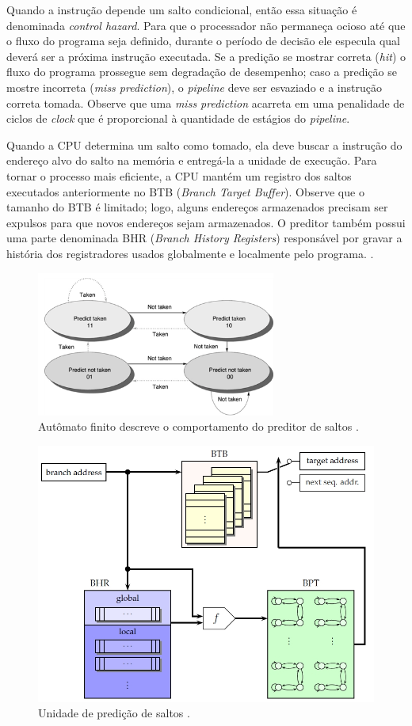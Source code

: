 Quando a instru\c{c}\~{a}o depende um salto condicional, ent\~{a}o essa situa\c{c}\~{a}o \'{e} denominada \textit{control hazard}. Para que o processador n\~{a}o permane\c{c}a ocioso at\'{e} que o fluxo do programa seja definido, durante o per\'{i}odo de decis\~{a}o ele especula qual dever\'{a} ser a pr\'{o}xima instru\c{c}\~{a}o executada. Se a predi\c{c}\~{a}o se mostrar correta (\textit{hit}) o fluxo do programa prossegue sem degrada\c{c}\~{a}o de desempenho; caso a predi\c{c}\~{a}o se mostre incorreta (\textit{miss prediction}), o \textit{pipeline} deve ser esvaziado e a instru\c{c}\~{a}o correta tomada. Observe que uma \textit{miss prediction} acarreta em uma penalidade de ciclos de \textit{clock} que \'{e} proporcional \`{a} quantidade de est\'{a}gios do \textit{pipeline}.

Quando a CPU determina um salto como tomado, ela deve buscar a instru\c{c}\~{a}o do endere\c{c}o alvo do salto na mem\'{o}ria e entreg\'{a}-la a unidade de execu\c{c}\~{a}o. Para tornar o processo mais eficiente, a CPU mant\'{e}m um registro dos saltos executados anteriormente no BTB (\textit{Branch Target Buffer}). Observe que o tamanho do BTB \'{e} limitado; logo, alguns endere\c{c}os armazenados precisam ser expulsos para que novos endere\c{c}os sejam armazenados.
O preditor tamb\'{e}m possui uma parte denominada BHR (\textit{Branch History Registers}) respons\'{a}vel por gravar a hist\'{o}ria dos registradores usados globalmente e localmente pelo programa. \cite{Jean-Pierre06predictingsecret}.

\begin{figure}[ht]
	\centering
	\includegraphics[width=0.7\textwidth]{figures/automato.png}
	\caption{Aut\^{o}mato finito descreve o comportamento do preditor de saltos \cite{493986}.}
	\label{fig:Fig_automato}
\end{figure}

\begin{figure}[ht]
	\centering
	\includegraphics[width=.5\textwidth]{figures/btu.jpg}
	\caption{Unidade de predi\c{c}\~{a}o de saltos \cite{Jean-Pierre06predictingsecret}.}
	\label{fig:Fig_btu}
\end{figure}

